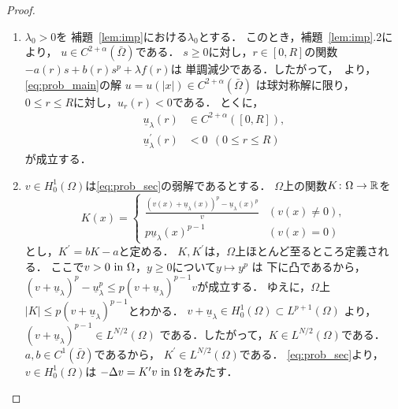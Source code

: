 \begin{proof}
 \begin{enumerate}[1.] \sage
  \item $\lambda_0 > 0$を
        補題~\ref{lem:imp}における$\lambda_0$とする．
        このとき，補題~\ref{lem:imp}.2により，
        $u \in C^{2+\alpha}(\bar{\Omega})$である．
        $s \geq 0$に対し，$r \in [0, R]$の関数
        $-a(r) s + b(r) s^p + \lambda f(r)$は
        単調減少である．したがって，\cite{MR544879}~より，
        \ref{eq:prob_main}の解
        $u = u(\lvert x \rvert) \in C^{2+\alpha}(\bar{\Omega})$
        は球対称解に限り，
        $0 \leq r \leq R$に対し，$u_r (r) < 0$である．
        とくに，
        \begin{align}
         \underline{u}_\lambda(r) & \in C^{2+ \alpha}([0, R]), 
          \label{eq:under_u_r} \\
         \underline{u}_\lambda^\prime(r) &< 0 \ \ (0 \leq r \leq R)
          \label{eq:under_u_r_prime}
        \end{align}
        が成立する．
  \item $v \in H_0^1(\Omega)$は\ref{eq:prob_sec}の弱解であるとする．
        $\Omega$上の関数$K \colon \Omega \to\mathbb{R}$を
        \begin{equation}
         K(x) = \begin{cases}
                 \displaystyle \frac{(v(x) + \underline{u}_\lambda(x))^p -
                 \underline{u}_\lambda(x)^p}{v} & ( v(x) \neq 0 ), \\
                 p \underline{u}_\lambda(x)^{p-1} & ( v(x) = 0 )
                \end{cases}
        \end{equation}
        とし，$K^\prime = b K - a$と定める．
        $K, K^\prime$は，$\Omega$上ほとんど至るところ定義される．
        ここで$v > 0 ~\text{in}~ \Omega$，$y \geq 0$について$y \mapsto y^p$
        は
        下に凸であるから，
        $(v + \underline{u}_\lambda)^p - \underline{u}_\lambda^p \leq
        p(v+ \underline{u}_\lambda)^{p-1} v$が成立する．
        ゆえに，$\Omega$上$\lvert K \rvert \leq p
        (v+\underline{u}_\lambda)^{p-1}$とわかる．
        $v + \underline{u}_\lambda \in H_0^1(\Omega) \subset
        L^{p+1}(\Omega)$
        より，$(v + \underline{u}_\lambda)^{p-1} \in L^{N/2}(\Omega)$
        である．したがって，$K \in L^{N/2}(\Omega)$である．
        $a, b \in C^1(\bar{\Omega})$であるから，
        $K^\prime \in L^{N/2}(\Omega)$である．
        \ref{eq:prob_sec}より，
        $v \in H_0^1(\Omega)$は
        $- \Delta v = K^\prime v ~\text{in}~ \Omega$をみたす．

\end{enumerate}
\end{proof}
